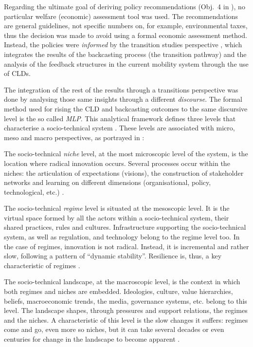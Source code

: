 Regarding the ultimate goal of deriving policy recommendations (Obj.~4 in ), no particular welfare (economic) assessment tool was used. The recommendations are general guidelines, not specific numbers on, for example, environmental taxes, thus the decision was made to avoid using a formal economic assessment method. Instead, the policies were \emph{informed} by the transition studies perspective \parencite{kemp2007_Transitionmanagementas}, which integrates the results of the backcasting process (the transition pathway) and the analysis of the feedback structures in the current mobility system through the use of CLDs.

The integration of the rest of the results through a transitions perspective was done by analysing those same insights through a different \emph{discourse}. The formal method used for rising the CLD and backcasting outcomes to the same discursive level is the so called \emph{\gls{MLP}}. This analytical framework defines three levels that characterise a socio-technical system \parencite{geels2001_Technologicaltransitionsas}. These levels are associated with micro, meso and macro perspectives, as portrayed in  \parencite{rotmans2001_Moreevolutionthan}:
\begin{enumeratealpha}
\item The socio-technical \emph{niche} level, at the most microscopic level of the system, is the location where radical innovation occurs. Several processes occur within the niches: the articulation of expectations (visions), the construction of stakeholder networks and learning on different dimensions (organisational, policy, technological, etc.) \parencite{geels2012_MultiLevelPerspective}.
\item The socio-technical \emph{regime} level is situated at the mesoscopic level. It is the virtual space formed by all the actors within a socio-technical system, their shared practices, rules and cultures. Infrastructure supporting the socio-technical system, as well as regulation, and technology belong to the regime level too. In the case of regimes, innovation is not radical. Instead, it is incremental and rather slow, following a pattern of ``dynamic stability''. Resilience is, thus, a key characteristic of regimes \parencite{geels2012_MultiLevelPerspective}.
\item The socio-technical landscape, at the macroscopic level, is the context in which both regimes and niches are embedded. Ideologies, culture, value hierarchies, beliefs, macroeconomic trends, the media, governance systems, etc. belong to this level. The landscape shapes, through pressures and support relations, the regimes and the niches. A characteristic of this level is the slow changes it suffers: regimes come and go, even more so niches, but it can take several decades or even centuries for change in the landscape to become apparent \parencite{rotmans2001_Moreevolutionthan,kemp2007_Transitionmanagementas,geels2012_MultiLevelPerspective}.
\end{enumeratealpha}

